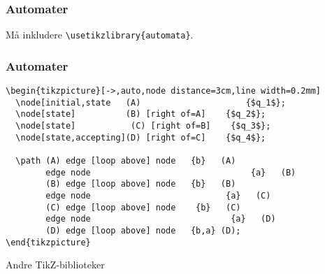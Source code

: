 \documentclass{beamer}
\begin{document}
\begin{frame}[fragile]
\frametitle{Automater}


\begin{center}
\end{center}

Må inkludere \texttt{\textbackslash usetikzlibrary\{automata\}}.

\end{frame}

\begin{frame}[fragile]
\frametitle{Automater}


\begin{Verbatim}[fontsize=\footnotesize, frame=single]
\begin{tikzpicture}[->,auto,node distance=3cm,line width=0.2mm]
  \node[initial,state   (A) 	          	    {$q_1$};
  \node[state]          (B) [right of=A]    {$q_2$};
  \node[state]	         (C) [right of=B]    {$q_3$};
  \node[state,accepting](D) [right of=C]    {$q_4$};

  \path (A) edge [loop above] node 	 {b}   (A)
	    edge node      			                 {a}   (B)
        (B) edge [loop above] node 	 {b}   (B)
	    edge node   	                    {a}   (C)
        (C) edge [loop above] node	  {b}   (C)
	    edge node 	    	                 {a}   (D)
        (D) edge [loop above] node 	 {b,a} (D);
\end{tikzpicture}
\end{Verbatim}

\end{frame}

\begin{frame}[fragile]
\begin{center}
\Huge{Andre TikZ-biblioteker}
\end{center}
\end{frame}
\end{document}
